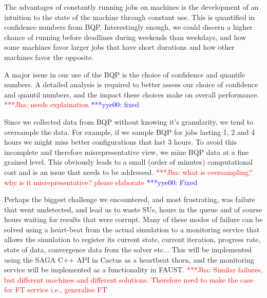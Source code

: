 \documentclass[conference,final]{IEEEtran}
\newcommand{\jhanote}[1]{ {\textcolor{red} { ***Jha: #1 }}}
\newcommand{\yyenote}[1]{ {\textcolor{blue} { ***yye00: #1 }}}
\newcommand{\jhanote}[1]{}
\newcommand{\yyenote}[1]{}
\begin{document}

The advantages of constantly running jobs on machines is the
development of an intuition to the state of the machine through
constant use. This is quantified in confidence numbers from
BQP. Interestingly enough, we could discern a higher chance of running
before deadlines during weekends than weekdays, and how some machines
favor larger jobs that have short durations and how other machines
favor the opposite.

A major issue in our use of the BQP is the choice of confidence and quantile
numbers. A detailed analysis is required to better assess our choice
of confidence and quantil numbers, and the impact
these choices make on overall performance. \jhanote{needs explaination}\yyenote{fixed}

Since we collected data from BQP without knowing it's granularity, we
tend to oversample the data. For example, if we sample
BQP for jobs lasting 1, 2 and 4 hours we might miss
better configurations that last 3 hours. To avoid this
incomplete and therefore misrepresentative view, we mine
BQP data at a fine grained level. This obviously leads to a small (order of
minutes) computational cost and is an issue that needs to be
addressed. \jhanote{what is oversampling? why is it misrepresentative?
  please elaborate} \yyenote{Fixed}

Perhaps the biggest challenge we encountered, and most frustrating,
was failure that went undetected, and lead us to waste SUs, hours in
the queue and of course hours waiting for results that were
corrupt. Many of these modes of failure can be solved using a
heart-beat from the actual simulation to a monitoring service that
allows the simulation to register its current state, current
iteration, progress rate, state of data, convergence data from the
solver etc... This will be implemented using the SAGA C++ API in
Cactus as a heartbeat thorn, and the monitoring service will be
implemented as a functionality in FAUST.  \jhanote{Similar failures,
  but different machines and different solutions. Therefore need to
  make the case for FT service i.e., generalise FT}
\end{document}
